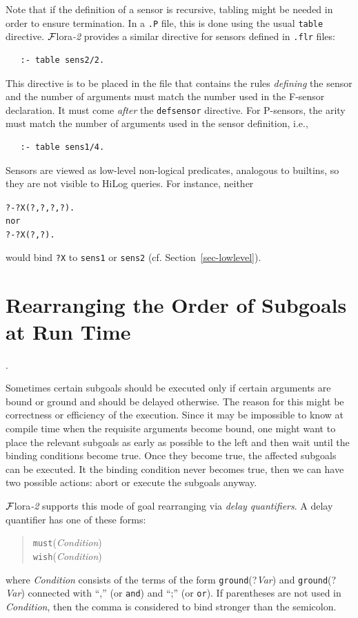 \documentclass[11pt]{article}
\newcommand{\FLORA}{{\mbox{\sc ${\cal F}${lora}\rm\emph{-2}}}\xspace}
\begin{document}
Note that if the definition of a sensor is recursive, tabling might be
needed in order to ensure termination. In a \texttt{.P} file, this is done
using the usual \texttt{table} directive. \FLORA provides a similar
directive for sensors defined in \texttt{.flr} files:
\begin{verbatim}
   :- table sens2/2.
\end{verbatim}
This directive is to be placed in the file that contains the rules \emph{defining}
the sensor and the number of arguments must match the number used in the
F-sensor declaration.
It must come \emph{after} the \texttt{defsensor} directive.  
For P-sensors, the arity must match the number of arguments used in the
sensor definition, i.e.,
\begin{verbatim}
   :- table sens1/4.
\end{verbatim}


Sensors are viewed as low-level non-logical predicates, analogous to
builtins, so
they are not visible to HiLog queries. For instance, neither
\begin{alltt}
   ?- ?X(?,?,?,?).
\textnormal{nor}
   ?- ?X(?,?).
\end{alltt}
would bind \texttt{?X}  to \texttt{sens1} or \texttt{sens2}
(cf. Section~\ref{sec-lowlevel}).

  
\section{Rearranging the Order of Subgoals at Run Time}.
\label{sev-rearanging}

Sometimes certain subgoals should be executed only if certain arguments are
bound or ground and should be delayed otherwise.
The reason for this might be correctness or efficiency of the execution.
Since it may be impossible to know at compile time when the requisite
arguments become bound, one might want to place the relevant subgoals as
early as possible to the left and then wait until the binding conditions
become true. Once they become true, the affected subgoals can be
executed. It the binding condition never becomes true, then we can have two
possible actions: abort or execute the subgoals anyway.

\FLORA supports this mode of goal rearranging via \emph{delay quantifiers}.  
A delay quantifier has one of these forms:
\begin{quote}
  \texttt{must}(\emph{Condition})\\
  \texttt{wish}(\emph{Condition})  
\end{quote}
where \emph{Condition} consists of the terms of the form
\texttt{ground}(?\emph{Var}) and \texttt{ground}(?\emph{Var})
connected with ``,'' (or \texttt{and}) and ``;'' (or \texttt{or}).  
If parentheses are not used in \emph{Condition}, then the comma is
considered to bind stronger than the semicolon. 
\end{document}
